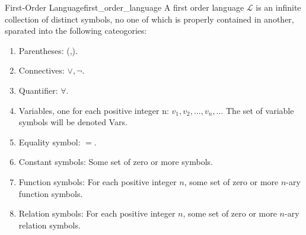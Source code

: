 \begin{definition}{First-Order Language}{first_order_language}
	A first order language $\mathcal{L}$ is an infinite collection of distinct symbols, no one of which is properly contained in another, sparated into the following cateogories:
	\begin{enumerate}
		\item Parentheses: (,).
		\item Connectives: $\lor, \neg$.
		\item Quantifier: $\forall$.
		\item Variables, one for each positive integer n: $v_{1}, v_{2}, \ldots, v_{n}, \ldots$ The set of variable symbols will be denoted Vars.
		\item Equality symbol: $=$.
		\item Constant symbols: Some set of zero or more symbols.
		\item Function symbols: For each positive integer $n$, some set of zero or more $n$-ary function symbols.
		\item Relation symbols: For each positive integer $n$, some set of zero or more $n$-ary relation symbols.
	\end{enumerate}
\end{definition}
